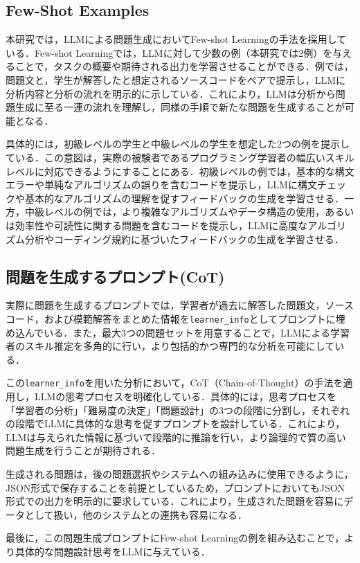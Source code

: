 \documentclass[11pt]{jreport}
\begin{document}
\begin{appendices}
\subsection{Few-Shot Examples}
本研究では，LLMによる問題生成においてFew-shot Learningの手法を採用している．Few-shot Learningでは，LLMに対して少数の例（本研究では2例）を与えることで，タスクの概要や期待される出力を学習させることができる．例では，問題文と，学生が解答したと想定されるソースコードをペアで提示し，LLMに分析内容と分析の流れを明示的に示している．これにより，LLMは分析から問題生成に至る一連の流れを理解し，同様の手順で新たな問題を生成することが可能となる．

具体的には，初級レベルの学生と中級レベルの学生を想定した2つの例を提示している．この意図は，実際の被験者であるプログラミング学習者の幅広いスキルレベルに対応できるようにすることにある．初級レベルの例では，基本的な構文エラーや単純なアルゴリズムの誤りを含むコードを提示し，LLMに構文チェックや基本的なアルゴリズムの理解を促すフィードバックの生成を学習させる．一方，中級レベルの例では，より複雑なアルゴリズムやデータ構造の使用，あるいは効率性や可読性に関する問題を含むコードを提示し，LLMに高度なアルゴリズム分析やコーディング規約に基づいたフィードバックの生成を学習させる．

\subsection{問題を生成するプロンプト(CoT)}
実際に問題を生成するプロンプトでは，学習者が過去に解答した問題文，ソースコード，および模範解答をまとめた情報を\texttt{learner\_info}としてプロンプトに埋め込んでいる．また，最大3つの問題セットを用意することで，LLMによる学習者のスキル推定を多角的に行い，より包括的かつ専門的な分析を可能にしている．

この\texttt{learner\_info}を用いた分析において，CoT（Chain-of-Thought）の手法を適用し，LLMの思考プロセスを明確化している．具体的には，思考プロセスを「学習者の分析」「難易度の決定」「問題設計」の3つの段階に分割し，それぞれの段階でLLMに具体的な思考を促すプロンプトを設計している．これにより，LLMは与えられた情報に基づいて段階的に推論を行い，より論理的で質の高い問題生成を行うことが期待される．

生成される問題は，後の問題選択やシステムへの組み込みに使用できるように，JSON形式で保存することを前提としているため，プロンプトにおいてもJSON形式での出力を明示的に要求している．これにより，生成された問題を容易にデータとして扱い，他のシステムとの連携も容易になる．

最後に，この問題生成プロンプトにFew-shot Learningの例を組み込むことで，より具体的な問題設計思考をLLMに与えている．


\end{appendices}
\end{document}
